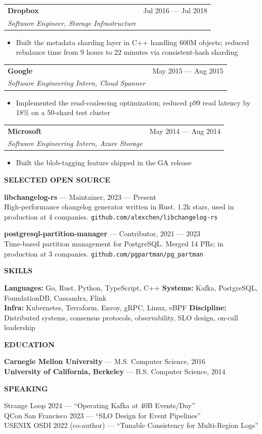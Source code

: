 \documentclass[letterpaper,10.5pt]{article}
\makeatletter
\newcommand{\sectionhead}[1]{%
  \vspace{14pt}%
  {\bfseries\fontsize{9}{11}\selectfont\textcolor{mintext}{\MakeUppercase{#1}}}%
  \vspace{8pt}%
}
\newcommand{\role}[3]{%
  \begin{tabularx}{\linewidth}{@{}Xr@{}}
    \textbf{#1} & \textcolor{minsec}{#3} \\
    \textit{#2} & \\
  \end{tabularx}
  \vspace{4pt}
}
\makeatother
\begin{document}
\vspace{6pt}
\role{Dropbox}{Software Engineer, Storage Infrastructure}{Jul 2016 --- Jul 2018}
\begin{itemize}
  \item Built the metadata sharding layer in C++ handling 600M objects; reduced rebalance time from 9 hours to 22 minutes via consistent-hash sharding
\end{itemize}

\vspace{6pt}
\role{Google}{Software Engineering Intern, Cloud Spanner}{May 2015 --- Aug 2015}
\begin{itemize}
  \item Implemented the read-coalescing optimization; reduced p99 read latency by 18\% on a 50-shard test cluster
\end{itemize}

\vspace{6pt}
\role{Microsoft}{Software Engineering Intern, Azure Storage}{May 2014 --- Aug 2014}
\begin{itemize}
  \item Built the blob-tagging feature shipped in the GA release
\end{itemize}

\sectionhead{Selected Open Source}
\textbf{libchangelog-rs} --- Maintainer, 2023 --- Present \\
High-performance changelog generator written in Rust. 1.2k stars, used in production at 4 companies. \texttt{github.com/alexchen/libchangelog-rs}

\vspace{4pt}
\textbf{postgresql-partition-manager} --- Contributor, 2021 --- 2023 \\
Time-based partition management for PostgreSQL. Merged 14 PRs; in production at 3 companies. \texttt{github.com/pgpartman/pg\_partman}

\sectionhead{Skills}
\textbf{Languages:} Go, Rust, Python, TypeScript, C++ \quad
\textbf{Systems:} Kafka, PostgreSQL, FoundationDB, Cassandra, Flink \\
\textbf{Infra:} Kubernetes, Terraform, Envoy, gRPC, Linux, eBPF \quad
\textbf{Discipline:} Distributed systems, consensus protocols, observability, SLO design, on-call leadership

\sectionhead{Education}
\textbf{Carnegie Mellon University} --- M.S. Computer Science, 2016 \\
\textbf{University of California, Berkeley} --- B.S. Computer Science, 2014

\sectionhead{Speaking}
Strange Loop 2024 --- ``Operating Kafka at 40B Events/Day'' \\
QCon San Francisco 2023 --- ``SLO Design for Event Pipelines'' \\
USENIX OSDI 2022 (co-author) --- ``Tunable Consistency for Multi-Region Logs''
\end{document}
